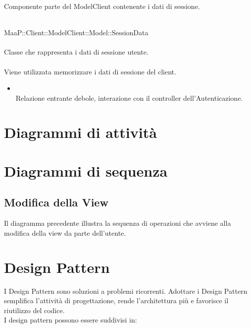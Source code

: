 Componente parte del ModelClient contenente i dati di sessione.

\\
MaaP::Client::ModelClient::Model::SessionData\\
\\
Classe che rappresenta i dati di sessione utente.\\
\\
Viene utilizzata memorizzare i dati di sessione del client.\\
\begin{itemize}
\item{}\\
Relazione entrante debole, interazione con il controller dell'Autenticazione.
\end{itemize}



\newpage
\section{Diagrammi di attività}


\section{Diagrammi di sequenza}
\subsection{Modifica della View}
Il diagramma precedente illustra la sequenza di operazioni che avviene alla modifica della view da parte dell'utente.

\newpage
\section{Design Pattern}
I Design Pattern sono soluzioni a problemi ricorrenti. Adottare i Design Pattern semplifica l'attività di progettazione, rende l'architettura più  e favorisce il riutilizzo del codice.\\
I design pattern possono essere suddivisi in:

